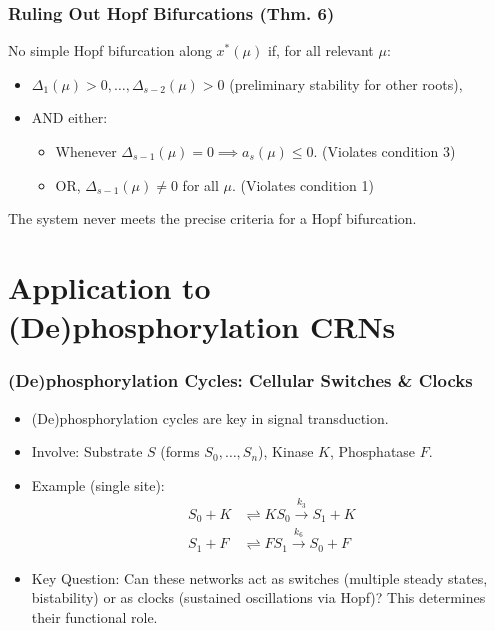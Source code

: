 \documentclass[aspectratio=169]{beamer}
\begin{document}
\begin{frame}{\insertsectionhead}
	\frametitle{Ruling Out Hopf Bifurcations (Thm. 6)}
	No simple Hopf bifurcation along $x^*(\mu)$ if, for all relevant $\mu$:
	\begin{itemize}
		\item $\Delta_1(\mu) > 0, \dots, \Delta_{s-2}(\mu) > 0$ (preliminary stability for other roots),
		\item AND either:
			\begin{itemize}
				\item Whenever $\Delta_{s-1}(\mu) = 0 \implies a_s(\mu) \le 0$. (Violates condition 3)
				\item OR, $\Delta_{s-1}(\mu) \neq 0$ for all $\mu$. (Violates condition 1)
			\end{itemize}
	\end{itemize}
	The system never meets the precise criteria for a Hopf bifurcation.
\end{frame}

\section{Application to (De)phosphorylation CRNs}

\begin{frame}{\insertsectionhead}
	\frametitle{(De)phosphorylation Cycles: Cellular Switches \& Clocks}
	\begin{itemize}
		\item (De)phosphorylation cycles are key in \alert{signal transduction}.
		\item Involve: Substrate $S$ (forms $S_0, \dots, S_n$), Kinase $K$, Phosphatase $F$.
		\item Example (single site):
			\begin{align*}
				S_0 + K &\rightleftharpoons KS_0 \xrightarrow{k_3} S_1 + K \\
				S_1 + F &\rightleftharpoons FS_1 \xrightarrow{k_6} S_0 + F
			\end{align*}
		\item \alert{Key Question}: Can these networks act as \alert{switches} (multiple steady states, bistability) or as \alert{clocks} (sustained oscillations via Hopf)? This determines their functional role.
	\end{itemize}
\end{frame}
\end{document}
